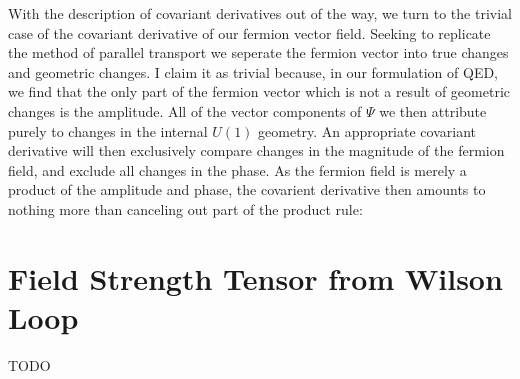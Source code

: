 \documentclass{article}
\begin{document}
        With the description of covariant derivatives out of the way, we turn to the trivial case of the covariant derivative of our fermion vector field. Seeking to replicate the method of parallel transport we seperate the fermion vector into true changes and geometric changes. I claim it as trivial because, in our formulation of QED, we find that the only part of the fermion vector which is not a result of geometric changes is the amplitude. All of the vector components of $\Psi$ we then attribute purely to changes in the internal $U(1)$ geometry. An appropriate covariant derivative will then exclusively compare changes in the magnitude of the fermion field, and exclude all changes in the phase. As the fermion field is merely a product of the amplitude and phase, the covarient derivative then amounts to nothing more than canceling out part of the product rule:






    

\section{Field Strength Tensor from Wilson Loop}
        TODO
\end{document}
